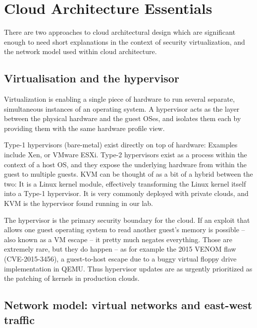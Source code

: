 \section{Cloud Architecture Essentials}
\label{sec:cloud_arch}

There are two approaches to cloud architectural design which are significant enough to need short explanations in the context of security virtualization, and the network model used within cloud architecture.

\subsection{Virtualisation and the hypervisor}
 Virtualization is enabling a single piece of hardware to run several separate, simultaneous instances of an operating system. A hypervisor acts as the layer between the physical hardware and the guest OSes, and isolates them each by providing them with the same hardware profile view.

Type-1 hypervisors (bare-metal) exist directly on top of hardware: Examples include Xen, or VMware ESXi. Type-2 hypervisors exist as a process within the context of a host OS, and they expose the underlying hardware from within the guest to multiple guests. KVM can be thought of as a bit of a hybrid between the two: It is a Linux kernel module, effectively transforming the Linux kernel itself into a Type-1 hypervisor. It is very commonly deployed with private clouds, and KVM is the hypervisor found running in our lab.

The hypervisor is the primary security boundary for the cloud. If an exploit that allows one guest operating system to read another guest's memory is possible -- also known as a VM escape -- it pretty much negates everything. Those are extremely rare, but they do happen -- as for example the 2015 VENOM flaw (CVE-2015-3456), a guest-to-host escape due to a buggy virtual floppy drive implementation in QEMU\cite{crowdstrike_venom2015}. Thus hypervisor updates are as urgently prioritized as the patching of kernels in production clouds.
\subsection{Network model: virtual networks and east-west traffic}

